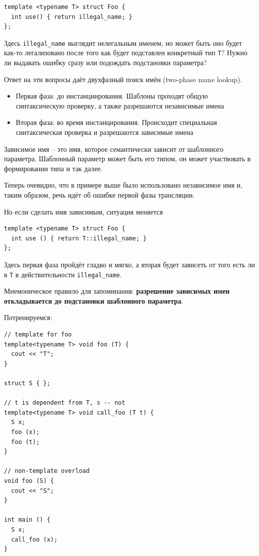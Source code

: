 \documentclass[a4paper,12pt,oneside]{book}
\begin{document}
\begin{lstlisting}
template <typename T> struct Foo {
  int use() { return illegal_name; }
};
\end{lstlisting}

Здесь \lstinline!illegal_name! выглядит нелегальным именем, но может быть оно будет как-то легализовано после того как будет подставлен конкретный тип \lstinline!T!? Нужно ли выдавать ошибку сразу или подождать подстановки параметра?

Ответ на эти вопросы даёт двухфазный поиск имён (two-phase name lookup).

\begin{itemize}
\item
Первая фаза: до инстанциирования. Шаблоны проходят общую синтаксическую проверку, а также разрешаются независимые имена
\item
Вторая фаза: во время инстанцирования. Происходит специальная синтаксическая проверка и разрешаются зависимые имена
\end{itemize}

Зависимое имя -- это имя, которое семантически зависит от шаблонного параметра. Шаблонный параметр может быть его типом, он может участвовать в формировании типа и так далее.

Теперь очевидно, что в примере выше было использовано независимое имя и, таким образом, речь идёт об ошибке первой фазы трансляции.

Но если сделать имя зависимым, ситуация меняется

\begin{lstlisting}
template <typename T> struct Foo {
  int use () { return T::illegal_name; }
};
\end{lstlisting}

Здесь первая фаза пройдёт гладко и мягко, а вторая будет зависеть от того есть ли в \lstinline!T! в действительности \lstinline!illegal_name!.

Мнемоническое правило для запоминания: \textbf{разрешение зависимых имен откладывается до подстановки шаблонного параметра}.

Потренируемся:

\begin{lstlisting}
// template for foo
template<typename T> void foo (T) { 
  cout << "T"; 
}

struct S { };

// t is dependent from T, s -- not
template<typename T> void call_foo (T t) {
  S x;
  foo (x);
  foo (t); 
}

// non-template overload
void foo (S) {   
  cout << "S"; 
}

int main () {
  S x; 
  call_foo (x); 
}
\end{lstlisting}
\end{document}
